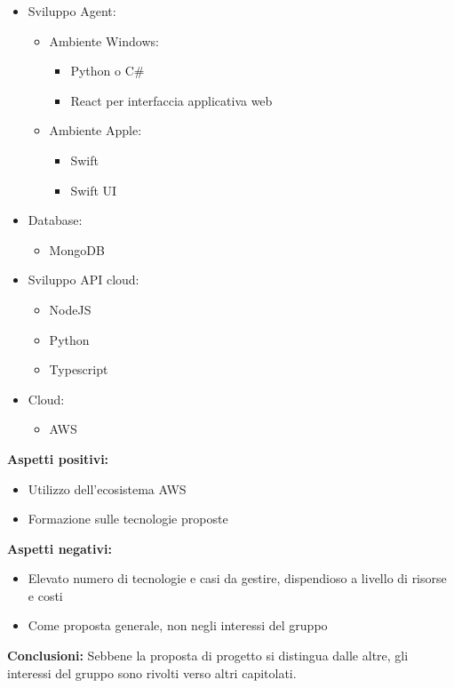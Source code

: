 \documentclass[10pt]{article}
\begin{document}
\begin{itemize}
    \item Sviluppo Agent:
    \begin{itemize}
        \item Ambiente Windows:
        \begin{itemize}
            \item Python o C\#
            \item React per interfaccia applicativa web
        \end{itemize}
        \item Ambiente Apple:
        \begin{itemize}
            \item Swift
            \item Swift UI
        \end{itemize}
    \end{itemize}
    \item Database:
    \begin{itemize}
        \item MongoDB
    \end{itemize}
    \item Sviluppo API cloud:
    \begin{itemize}
        \item NodeJS
        \item Python
        \item Typescript
    \end{itemize}
    \item Cloud:
    \begin{itemize}
        \item AWS
    \end{itemize}
\end{itemize}
\textbf{Aspetti positivi:}
\begin{itemize}
    \item Utilizzo dell'ecosistema AWS
    \item Formazione sulle tecnologie proposte
\end{itemize}
\textbf{Aspetti negativi:}
\begin{itemize}
    \item Elevato numero di tecnologie e casi da gestire, dispendioso a livello di risorse e costi
    \item Come proposta generale, non negli interessi del gruppo
\end{itemize}
\textbf{Conclusioni:}
Sebbene la proposta di progetto si distingua dalle altre, gli interessi del gruppo sono rivolti verso altri capitolati.
\end{document}

